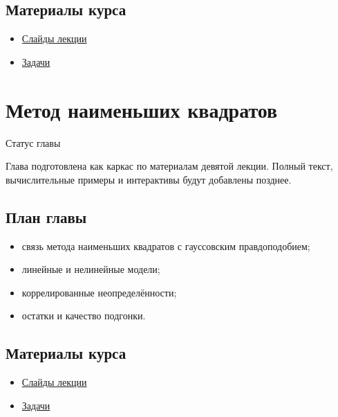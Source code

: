 \documentclass[
  russian,
  letterpaper,
]{scrbook}
\providecommand{\tightlist}{%
  \setlength{\itemsep}{0pt}\setlength{\parskip}{0pt}}
\begin{document}
\section{Материалы
курса}\label{ux43cux430ux442ux435ux440ux438ux430ux43bux44b-ux43aux443ux440ux441ux430-5}

\begin{itemize}
\tightlist
\item
  \href{https://neutrinohit.github.io/statistical-analysis-course/ru/slides/07_parameter_estimation_and_maximum_likelihood.html}{Слайды
  лекции}
\item
  \href{https://neutrinohit.github.io/statistical-analysis-course/ru/slides/exercises/07_parameter_estimation_and_maximum_likelihood_exercises.html}{Задачи}
\end{itemize}

\chapter{Метод наименьших
квадратов}\label{ux43cux435ux442ux43eux434-ux43dux430ux438ux43cux435ux43dux44cux448ux438ux445-ux43aux432ux430ux434ux440ux430ux442ux43eux432}

{Статус главы}

Глава подготовлена как каркас по материалам девятой лекции. Полный
текст, вычислительные примеры и интерактивы будут добавлены позднее.

\section{План
главы}\label{ux43fux43bux430ux43d-ux433ux43bux430ux432ux44b-7}

\begin{itemize}
\tightlist
\item
  связь метода наименьших квадратов с гауссовским правдоподобием;
\item
  линейные и нелинейные модели;
\item
  коррелированные неопределённости;
\item
  остатки и качество подгонки.
\end{itemize}

\section{Материалы
курса}\label{ux43cux430ux442ux435ux440ux438ux430ux43bux44b-ux43aux443ux440ux441ux430-6}

\begin{itemize}
\tightlist
\item
  \href{https://neutrinohit.github.io/statistical-analysis-course/ru/slides/08_method_of_least_squares.html}{Слайды
  лекции}
\item
  \href{https://neutrinohit.github.io/statistical-analysis-course/ru/slides/exercises/08_method_of_least_squares_exercises.html}{Задачи}
\end{itemize}
\end{document}

